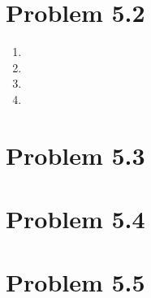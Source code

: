 \documentclass{article}
\begin{document}
\section*{Problem 5.2}
\begin{enumerate}[label=(\alph*)]
  \item
  \item
  \item
  \item
\end{enumerate}

\section*{Problem 5.3}

\section*{Problem 5.4}

\section*{Problem 5.5}
\end{document}
